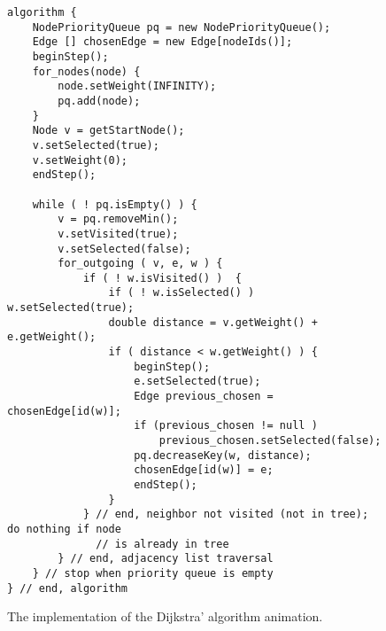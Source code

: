 \begin{figure}

\small
\begin{verbatim}
algorithm {
    NodePriorityQueue pq = new NodePriorityQueue();
    Edge [] chosenEdge = new Edge[nodeIds()]; 
    beginStep();
    for_nodes(node) {
        node.setWeight(INFINITY);
        pq.add(node);
    }
    Node v = getStartNode();
    v.setSelected(true);
    v.setWeight(0);
    endStep();

    while ( ! pq.isEmpty() ) {
        v = pq.removeMin();
        v.setVisited(true);
        v.setSelected(false);
        for_outgoing ( v, e, w ) {
            if ( ! w.isVisited() )  {
                if ( ! w.isSelected() ) w.setSelected(true);
                double distance = v.getWeight() + e.getWeight();
                if ( distance < w.getWeight() ) {
                    beginStep();
                    e.setSelected(true);
                    Edge previous_chosen = chosenEdge[id(w)];
                    if (previous_chosen != null )
                        previous_chosen.setSelected(false);
                    pq.decreaseKey(w, distance);
                    chosenEdge[id(w)] = e;
                    endStep();
                }
            } // end, neighbor not visited (not in tree); do nothing if node
              // is already in tree
        } // end, adjacency list traversal
    } // stop when priority queue is empty
} // end, algorithm
\end{verbatim}

\caption{The implementation of the Dijkstra' algorithm animation.}
\label{fig:dijkstra}
\end{figure}
